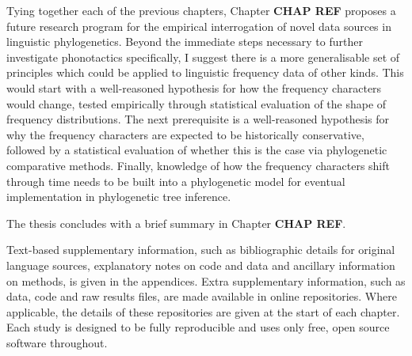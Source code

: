 Tying together each of the previous chapters, Chapter \textbf{CHAP REF} proposes a future research program for the empirical interrogation of novel data sources in linguistic phylogenetics. Beyond the immediate steps necessary to further investigate phonotactics specifically, I suggest there is a more generalisable set of principles which could be applied to linguistic frequency data of other kinds. This would start with a well-reasoned hypothesis for how the frequency characters would change, tested empirically through statistical evaluation of the shape of frequency distributions. The next prerequisite is a well-reasoned hypothesis for why the frequency characters are expected to be historically conservative, followed by a statistical evaluation of whether this is the case via phylogenetic comparative methods. Finally, knowledge of how the frequency characters shift through time needs to be built into a phylogenetic model for eventual implementation in phylogenetic tree inference.

The thesis concludes with a brief summary in Chapter \textbf{CHAP REF}.

Text-based supplementary information, such as bibliographic details for original language sources, explanatory notes on code and data and ancillary information on methods, is given in the appendices. Extra supplementary information, such as data, code and raw results files, are made available in online repositories. Where applicable, the details of these repositories are given at the start of each chapter. Each study is designed to be fully reproducible and uses only free, open source software throughout.

